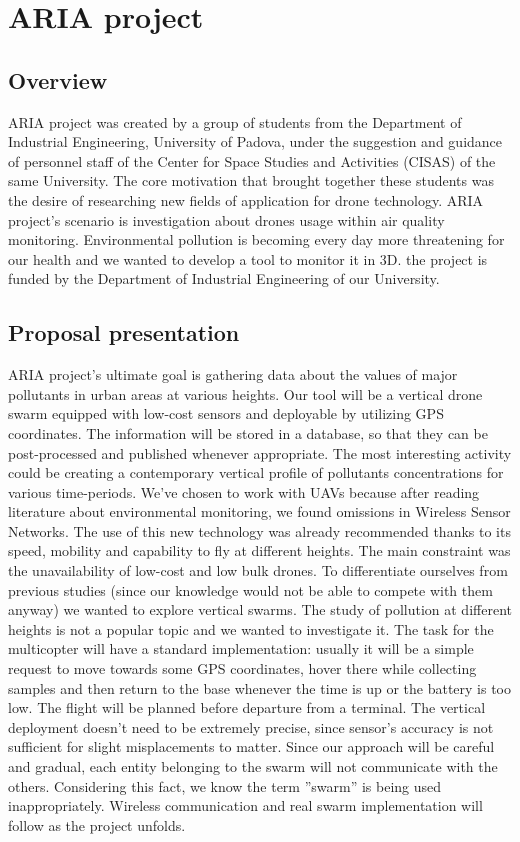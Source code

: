 \chapter{ARIA project}
\section{Overview}
ARIA project was created by a group of students from the Department of Industrial Engineering, University of Padova, under the suggestion and guidance of personnel staff of the Center for Space Studies and Activities (CISAS) of the same University. The core motivation that brought together these students was the desire of researching new fields of application for drone technology. ARIA project’s scenario is investigation about drones usage within air quality monitoring. Environmental pollution is becoming every day more threatening for our health and we wanted to develop a tool to monitor it in 3D. the project is funded by the Department of Industrial Engineering of our University.
\section{Proposal presentation}
ARIA project’s ultimate goal is gathering data about the
values of major pollutants in urban areas at various heights.
Our tool will be a vertical drone swarm equipped with low-cost sensors and deployable by utilizing GPS coordinates. The
information will be stored in a database, so that they can be
post-processed and published whenever appropriate. The most
interesting activity could be creating a contemporary vertical
profile of pollutants concentrations for various time-periods.
We’ve chosen to work with UAVs because after reading
literature about environmental monitoring, we found omissions
in Wireless Sensor Networks. The use of this new technology
was already recommended thanks to its speed, mobility and
capability to fly at different heights. The main constraint was
the unavailability of low-cost and low bulk drones.
To differentiate ourselves from previous studies (since our
knowledge would not be able to compete with them anyway)
we wanted to explore vertical swarms. The study of pollution
at different heights is not a popular topic and we wanted to
investigate it.
The task for the multicopter will have a standard implementation: usually it will be a simple request to move towards some
GPS coordinates, hover there while collecting samples and then
return to the base whenever the time is up or the battery is too
low. The flight will be planned before departure from a
terminal. The vertical deployment doesn’t need to be extremely
precise, since sensor’s accuracy is not sufficient for slight
misplacements to matter. Since our approach will be careful
and gradual, each entity belonging to the swarm will not
communicate with the others. Considering this fact, we know
the term ”swarm” is being used inappropriately. Wireless
communication and real swarm implementation will follow as
the project unfolds.

